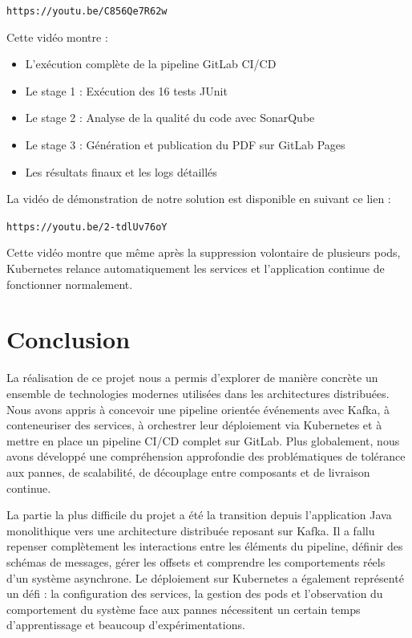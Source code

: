 \documentclass[10pt,a4paper]{article}
\begin{document}
\texttt{https://youtu.be/C856Qe7R62w}

Cette vidéo montre :
\begin{itemize}
    \item L'exécution complète de la pipeline GitLab CI/CD
    \item Le stage 1 : Exécution des 16 tests JUnit
    \item Le stage 2 : Analyse de la qualité du code avec SonarQube
    \item Le stage 3 : Génération et publication du PDF sur GitLab Pages
    \item Les résultats finaux et les logs détaillés
\end{itemize}

La vidéo de démonstration de notre solution est disponible en suivant ce lien :

\texttt{https://youtu.be/2-tdlUv76oY}

Cette vidéo montre que même après la suppression volontaire de plusieurs pods, Kubernetes relance automatiquement les services et l’application continue de fonctionner normalement.

\section{Conclusion}

La réalisation de ce projet nous a permis d’explorer de manière concrète un ensemble de technologies modernes utilisées dans les architectures distribuées. Nous avons appris à concevoir une pipeline orientée événements avec Kafka, à conteneuriser des services, à orchestrer leur déploiement via Kubernetes et à mettre en place un pipeline CI/CD complet sur GitLab. Plus globalement, nous avons développé une compréhension approfondie des problématiques de tolérance aux pannes, de scalabilité, de découplage entre composants et de livraison continue.

La partie la plus difficile du projet a été la transition depuis l’application Java monolithique vers une architecture distribuée reposant sur Kafka. Il a fallu repenser complètement les interactions entre les éléments du pipeline, définir des schémas de messages, gérer les offsets et comprendre les comportements réels d’un système asynchrone. Le déploiement sur Kubernetes a également représenté un défi : la configuration des services, la gestion des pods et l’observation du comportement du système face aux pannes nécessitent un certain temps d’apprentissage et beaucoup d’expérimentations.
\end{document}
